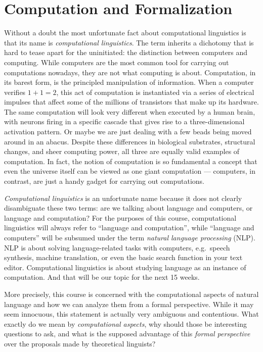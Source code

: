 \chapter{Computation and Formalization}
\label{cha:Formal}

Without a doubt the most unfortunate fact about computational linguistics is that its name is \emph{computational linguistics}.
The term inherits a dichotomy that is hard to tease apart for the uninitiated: the distinction between computers and computing.
While computers are the most common tool for carrying out computations nowadays, they are not what computing is about.
Computation, in its barest form, is the principled manipulation of information.
When a computer verifies $1 + 1 = 2$, this act of computation is instantiated via a series of electrical impulses that affect some of the millions of transistors that make up its hardware.
The same computation will look very different when executed by a human brain, with neurons firing in a specific cascade that gives rise to a three-dimensional activation pattern.
Or maybe we are just dealing with a few beads being moved around in an abacus.
Despite these differences in biological substrates, structural changes, and sheer computing power, all three are equally valid examples of computation.
In fact, the notion of computation is so fundamental a concept that even the universe itself can be viewed as one giant computation --- computers, in contrast, are just a handy gadget for carrying out computations.

\emph{Computational linguistics} is an unfortunate name because it does not clearly disambiguate these two terms: 
are we talking about language and computers, or language and computation?
For the purposes of this course, computational linguistics will always refer to ``language and computation'', while ``language and computers'' will be subsumed under the term \emph{natural language processing} (NLP).
NLP is about solving language-related tasks with computers, e.g.\ speech synthesis, machine translation, or even the basic search function in your text editor.
Computational linguistics is about studying language as an instance of computation.
And that will be our topic for the next 15 weeks.

More precisely, this course is concerned with the computational aspects of natural language and how we can analyze them from a formal perspective.
While it may seem innocuous, this statement is actually very ambiguous and contentious.
What exactly do we mean by \emph{computational aspects}, why should those be interesting questions to ask, and what is the supposed advantage of this \emph{formal perspective} over the proposals made by theoretical linguists?

